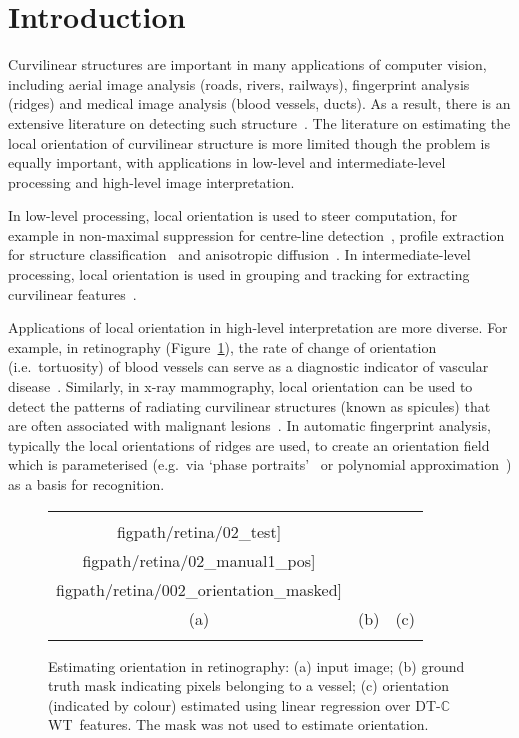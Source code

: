 \documentclass[runningheads,a4paper]{llncs}
\newcommand{\fref}[1]{Figure~\ref{#1}}
\def\dtcwt{DT-$\mathbb{C}$WT}
\def\figpath{./figs}
\def\ie{i.e.}
\def\eg{e.g.}
\begin{document}
\section{Introduction}
\label{s:introduction}
Curvilinear structures are important in many applications of computer vision, including aerial image analysis (roads, rivers, railways), fingerprint analysis (ridges) and medical image analysis (blood vessels, ducts). As a result, there is an extensive literature on detecting such structure~\cite{Papari_Petkov_IVC11,Staal_etal_TMI04,Ricci_Perfetti_TMI07}. The literature on estimating the local orientation of curvilinear structure is more limited though the problem is equally important, with applications in low-level and intermediate-level processing and high-level image interpretation.

In low-level processing, local orientation is used to steer computation, for example in non-maximal suppression for centre-line detection~\cite{Sonka_99}, profile extraction for structure classification~\cite{Zwiggelaar_etal_TMI04} and anisotropic diffusion~\cite{Perona_PAMI90}.  In intermediate-level processing, local orientation is used in grouping and tracking for extracting curvilinear features~\cite{Aylward_Bullitt_TMI02,Staal_etal_TMI04}.

Applications of local orientation in high-level interpretation are more diverse. For example, in retinography (\fref{f:retinography}), the rate of change of orientation (\ie~tortuosity) of blood vessels can serve as a diagnostic indicator of vascular disease~\cite{Hart_etal_IJMI99}. Similarly, in x-ray mammography, local orientation can be used to detect the patterns of radiating curvilinear structures (known as spicules) that are often associated with malignant lesions~\cite{Zwiggelaar_etal_MIA99,Karssemeijer_teBrake_TMI96,Rangayyan_Ayres_MBEC06}. In automatic fingerprint analysis, typically the local orientations of ridges are used, to create an orientation field~\cite{Bazen_Gerez_TPAMI02,Mei_etal_IVC09} which is parameterised (\eg~via `phase portraits'~\cite{Li_etal_PR06} or polynomial approximation~\cite{Gu_etal_PR04}) as a basis for recognition.


\begin{figure}[t]
\centering
\begin{tabular}{@{}c c c@{}}
\texttt{[image: \\figpath/retina/02\_test]} &
\texttt{[image: \\figpath/retina/02\_manual1\_pos]} &
\texttt{[image: \\figpath/retina/002\_orientation\_masked]} \\
(a) & (b) & (c) \\
\noalign{\smallskip}
\end{tabular}
%
\caption{Estimating orientation in retinography: %
(a) input image; %
(b) ground truth mask indicating pixels belonging to a vessel; %
(c) orientation (indicated by colour) estimated using linear regression over \dtcwt~features. The mask was not used to estimate orientation. %
}
\label{f:retinography}
\end{figure}
\end{document}

